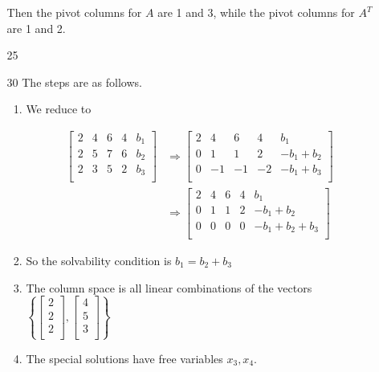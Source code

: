 \documentclass[12pt,letterpaper]{article}
\begin{document}
\begin{enumerate}[label=\S 2.\arabic*]
\begin{enumerate}
          Then the pivot columns for $A$ are 1 and 3,
          while the pivot columns for $A^T$ are 1 and 2.
        \item [25]
        \item [30]
          The steps are as follows.

          \begin{enumerate}[label=Step \arabic*]
            \item
              We reduce to

              \begin{align*}
                \begin{bmatrix}
                  2 & 4 & 6 & 4 & b_1 \\
                  2 & 5 & 7 & 6 & b_2 \\
                  2 & 3 & 5 & 2 & b_3 \\
                \end{bmatrix}
                &\Rightarrow
                \begin{bmatrix}
                  2 &  4 &  6 &  4 & b_1 \\
                  0 &  1 &  1 &  2 & -b_1 + b_2 \\
                  0 & -1 & -1 & -2 & -b_1 + b_3 \\
                \end{bmatrix}
                \\
                &\Rightarrow
                \begin{bmatrix}
                  2 &  4 &  6 &  4 & b_1 \\
                  0 &  1 &  1 &  2 & -b_1 + b_2 \\
                  0 &  0 &  0 &  0 & -b_1 + b_2 + b_3 \\
                \end{bmatrix}
              \end{align*}
            \item
              So the solvability condition is $b_1 = b_2 + b_3$
            \item
              The column space is all linear combinations of the vectors
              $
                \left\{
                  \begin{bmatrix}
                    2 \\
                    2 \\
                    2 \\
                  \end{bmatrix}
                  ,
                  \begin{bmatrix}
                    4 \\
                    5 \\
                    3 \\
                  \end{bmatrix}
                \right\}
              $
            \item
              The special solutions have free variables $x_3, x_4$.


\end{enumerate}
\end{enumerate}
\end{enumerate}
\end{document}
